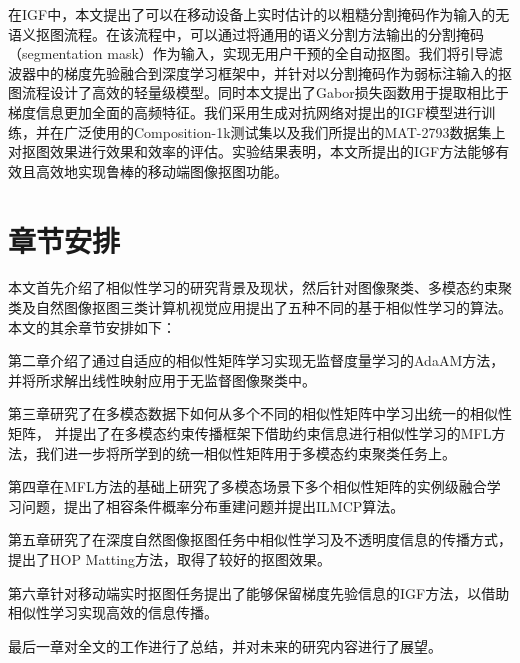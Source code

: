 在IGF中，本文提出了可以在移动设备上实时估计的以粗糙分割掩码作为输入的无语义抠图流程。在该流程中，可以通过将通用的语义分割方法输出的分割掩码（segmentation mask）作为输入，实现无用户干预的全自动抠图。我们将引导滤波器\cite{he2010guided}中的梯度先验融合到深度学习框架中，并针对以分割掩码作为弱标注输入的抠图流程设计了高效的轻量级模型。同时本文提出了Gabor损失函数用于提取相比于梯度信息更加全面的高频特征。我们采用生成对抗网络对提出的IGF模型进行训练，并在广泛使用的Composition-1k测试集以及我们所提出的MAT-2793数据集上对抠图效果进行效果和效率的评估。实验结果表明，本文所提出的IGF方法能够有效且高效地实现鲁棒的移动端图像抠图功能。



\section{章节安排}
本文首先介绍了相似性学习的研究背景及现状，然后针对图像聚类、多模态约束聚类及自然图像抠图三类计算机视觉应用提出了五种不同的基于相似性学习的算法。
本文的其余章节安排如下：

第二章介绍了通过自适应的相似性矩阵学习实现无监督度量学习的AdaAM方法，并将所求解出线性映射应用于无监督图像聚类中。

第三章研究了在多模态数据下如何从多个不同的相似性矩阵中学习出统一的相似性矩阵，
并提出了在多模态约束传播框架下借助约束信息进行相似性学习的MFL方法，我们进一步将所学到的统一相似性矩阵用于多模态约束聚类任务上。

第四章在MFL方法的基础上研究了多模态场景下多个相似性矩阵的实例级融合学习问题，提出了相容条件概率分布重建问题并提出ILMCP算法。

第五章研究了在深度自然图像抠图任务中相似性学习及不透明度信息的传播方式，提出了HOP Matting方法，取得了较好的抠图效果。

第六章针对移动端实时抠图任务提出了能够保留梯度先验信息的IGF方法，以借助相似性学习实现高效的信息传播。

最后一章对全文的工作进行了总结，并对未来的研究内容进行了展望。